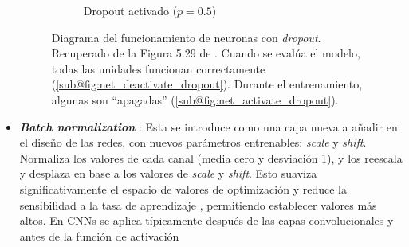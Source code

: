 \begin{itemize}
\begin{figure}[htbp]
\begin{subfigure}[b]{0.45\textwidth}
            \caption{Dropout activado ($p=0.5$)}
            \label{fig:net_activate_dropout}
        \end{subfigure}

        \caption[
            Diagrama del funcionamiento de neuronas con \textit{dropout}.
            Recuperado de la Figura 5.29 de \cite{szeliski2010}.
        ]{
            Diagrama del funcionamiento de neuronas con \textit{dropout}.
            Recuperado de la Figura 5.29 de \cite{szeliski2010}.
            Cuando se evalúa el modelo, todas las unidades funcionan correctamente 
            (\ref{sub@fig:net_deactivate_dropout}). Durante el entrenamiento, algunas son ``apagadas'' 
            (\ref{sub@fig:net_activate_dropout}). 
        }
        \label{fig:net_with_dropout}
    \end{figure}
    
    \item \textbf{\textit{Batch normalization}} \cite{ioffe2015}: Esta se introduce como una capa nueva a 
    añadir en el diseño de las redes, con nuevos parámetros entrenables: \textit{scale} y \textit{shift}. 
    Normaliza los valores de cada canal (media cero y desviación 1), y los reescala y desplaza en base a los
    valores de \textit{scale} y \textit{shift}. 
    Esto suaviza significativamente el espacio de valores de optimización \cite{santurkar2019} y reduce la 
    sensibilidad a la tasa de aprendizaje \cite{arora2018}, permitiendo establecer valores más altos.
    En CNNs se aplica típicamente después de las capas convolucionales y antes de la función de activación
    
\end{itemize}




